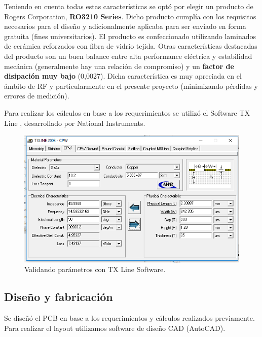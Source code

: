 \documentclass[10pt, a4paper, twocolumn]{article}
\begin{document}
Teniendo en cuenta todas estas características se optó por elegir un producto de
Rogers Corporation, \textbf{RO3210 Series}\cite{rogers}. Dicho producto cumplía con los requisitos necesarios para el diseño y adicionalmente aplicaba para ser enviado en forma gratuita (fines universitarios). El producto es confeccionado utilizando laminados de cerámica reforzados con fibra de vidrio tejida. Otras características destacadas del producto son
un buen balance entre alta performance eléctrica y estabilidad mecánica (generalmente
hay una relación de compromiso) y un \textbf{factor de disipación muy bajo} (0,0027). Dicha
característica es muy apreciada en el ámbito de RF y particularmente en el presente proyecto
(minimizando pérdidas y errores de medición).

Para realizar los cálculos en base a los requerimientos se utilizó el Software
TX Line \cite{txline}, desarrollado por National Instruments.

\begin{figure}[hbt!]
	\includegraphics[width=\linewidth]{Fotos/TXLine.png}
	\caption{Validando parámetros con TX Line Software.}
\end{figure}

\subsection{Diseño y fabricación}

Se diseñó el PCB en base a los requerimientos y cálculos realizados previamente.
Para realizar el layout utilizamos software de diseño CAD (AutoCAD).
\end{document}
